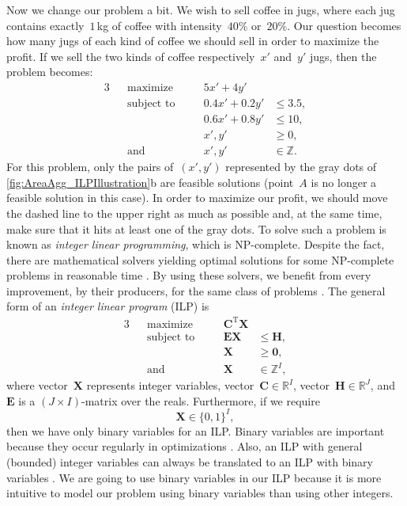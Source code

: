 \documentclass[acmsmall,natbib=false]{acmart}
\begin{document}
Now we change our problem a bit.
We wish to sell coffee in jugs,
where each jug contains exactly~$1\,$kg of coffee 
with intensity~$40\%$ or~$20\%$.
Our question becomes how many jugs of each kind of coffee
we should sell in order to maximize the profit.
If we sell the two kinds of coffee 
respectively~$x'$ and~$y'$ jugs,
then the problem becomes:
\begin{alignat*}{3}
&&\text{maximize} 	\quad	&& 5x'+4y' 		&			\\
&&\text{subject to} \quad	&& 0.4x'+0.2y'	&\le 3.5, 	\\
&&					\quad	&& 0.6x'+0.8y' 	&\le 10, 	\\
&&					\quad	&& x', y' 		&\ge 0, 	\\
&&\text{and} 		\quad	&& x', y'		&\in \mathbb{Z}.
\end{alignat*}
For this problem, only the pairs of~$(x',y')$ 
represented by the gray dots of 
\fig\ref{fig:AreaAgg_ILPIllustration}b 
are feasible solutions
(point~$A$ is no longer a feasible solution in this case).
In order to maximize our profit,
we should move the dashed line to the upper right 
as much as possible
and, at the same time, make sure that 
it hits at least one of the gray dots.
To solve such a problem is known as
\emph{integer linear programming},
which is NP-complete.
Despite the fact, there are
mathematical solvers yielding optimal solutions
for some NP-complete problems in reasonable time
\parencite{Haunert2017Label}.
By using these solvers, 
we benefit from every improvement, by their producers,
for the same class of problems
\parencite{Haunert2017Label}.
The general form of an \emph{integer linear program} (ILP) is
\begin{alignat*}{3}
&&\text{maximize} 	\quad&& \bm{C}^\mathrm{T}\bm{X}	&		\\
&&\text{subject to} \quad&& \bm{EX}			&\le \bm{H}, 	\\
&&					\quad&& \bm{X} 			&\ge \bm{0}, 	\\
&&\text{and}		\quad&& \bm{X} 			&\in \mathbb{Z}^I,
\end{alignat*}
where vector~$\bm{X}$ represents integer variables, 
vector~$\bm{C} \in \mathbb{R}^I$, 
vector~$\bm{H} \in \mathbb{R}^J$,
and~$\bm{E}$ is a $(J \times I)$-matrix over the reals.
Furthermore, if we require 
$$
\bm{X} 	\in \{0,1\}^I,
$$
then we have only binary variables for an ILP.
Binary variables are important 
because they occur regularly in optimizations
\parencite[]{bradley1977applied}.
Also, an ILP with general (bounded) integer variables 
can always be translated to an ILP with binary variables
\parencite[]{Williams2009Integer}.
We are going to use binary variables in our ILP
because it is more intuitive 
to model our problem using binary variables
than using other integers.
\end{document}
